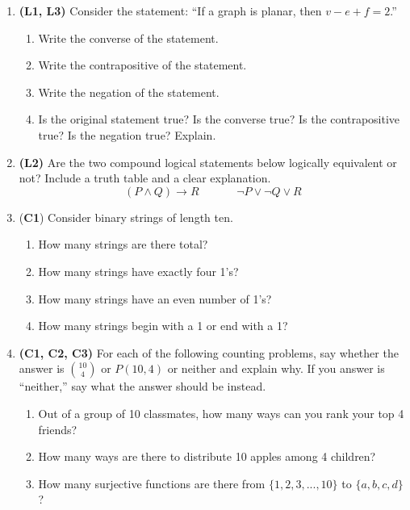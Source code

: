 \documentclass[12pt]{article}
\begin{document}
\begin{enumerate}
\begin{enumerate}
\end{enumerate}

\item \textbf{(L1, L3)} Consider the statement: ``If a graph is planar, then $v-e+f=2$.''
\begin{enumerate}
    \item Write the converse of the statement.
    \item Write the contrapositive of the statement.
    \item Write the negation of the statement.
    \item Is the original statement true? Is the converse true? Is the contrapositive true? Is the negation true? Explain.
\end{enumerate}

\item
\textbf{(L2)} Are the two compound logical statements below logically equivalent or not? Include a truth table and a clear explanation.
\[
(P \land Q) \rightarrow R \hspace{40pt} \lnot P \lor \lnot Q \lor R
\]

\item (\textbf{C1}) Consider binary strings of length ten.

\begin{enumerate}
    \item How many strings are there total?
    \item How many strings have exactly four 1's?
    \item How many strings have an even number of 1's?
    \item How many strings begin with a 1 or end with a 1?
\end{enumerate}

\item \textbf{(C1, C2, C3)} For each of the following counting problems, say whether the answer is $\binom{10}{4}$ or $P(10,4)$ or neither and explain why. If you answer is “neither,” say what the answer should be instead.

\begin{enumerate}
    \item Out of a group of 10 classmates, how many ways can you rank your top 4 friends?
    
    \item How many ways are there to distribute 10 apples among 4 children?
    
    \item How many surjective functions are there from $\{1,2,3,...,10\}$ to $\{a,b,c,d\}$?
    

\end{enumerate}
\end{enumerate}
\end{document}
